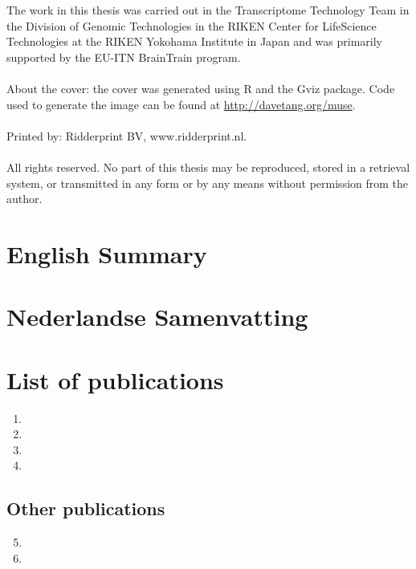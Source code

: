 \documentclass[11pt,a4paper]{report}
\begin{document}
\newpage

\normalsize
{
   \setlength{\parindent}{0cm}
   The work in this thesis was carried out in the Transcriptome Technology Team in the Division of Genomic Technologies in the RIKEN Center for LifeScience Technologies at the RIKEN Yokohama Institute in Japan and was primarily supported by the EU-ITN BrainTrain program.
   \\
   \\
   About the cover: the cover was generated using R and the Gviz package. Code used to generate the image can be found at \href{http://davetang.org/muse/2015/02/06/thesis-cover-art/}{http://davetang.org/muse}.
   \\
   \\
   Printed by: Ridderprint BV, www.ridderprint.nl.
   \\
   \\
   All rights reserved. No part of this thesis may be reproduced, stored in a retrieval system, or transmitted in any form or by any means without permission from the author.
}

\chapter*{English Summary}
\small


\chapter*{Nederlandse Samenvatting}

\normalsize

\chapter*{List of publications}

\begin{enumerate}
   \item {}
   \item {}
   \item {}
   \item {}
\end{enumerate}

\section*{Other publications}

\begin{enumerate}
   \setcounter{enumi}{4}
   \item {}
   \item {}
\end{enumerate}
\end{document}
